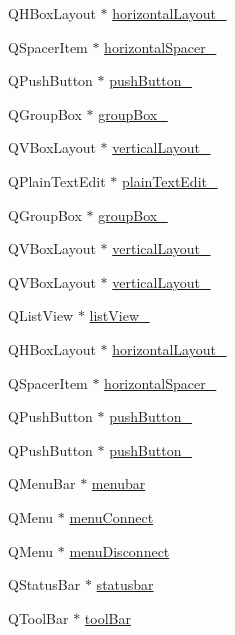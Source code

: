 \begin{DoxyCompactItemize}
\item 
Q\+H\+Box\+Layout $\ast$ \hyperlink{class_ui___client_view_a320d512fe1c190255fadb042dee71aa8}{horizontal\+Layout\+\_}
\item 
Q\+Spacer\+Item $\ast$ \hyperlink{class_ui___client_view_a1d8e4fc5f366b60e3dabdf6de7ff1a13}{horizontal\+Spacer\+\_}
\item 
Q\+Push\+Button $\ast$ \hyperlink{class_ui___client_view_abd60dd3bf35fb58cfc7a56dc620bb86d}{push\+Button\+\_}
\item 
Q\+Group\+Box $\ast$ \hyperlink{class_ui___client_view_a3c3b68713d02d91d0e03bbb7606d8d87}{group\+Box\+\_}
\item 
Q\+V\+Box\+Layout $\ast$ \hyperlink{class_ui___client_view_a706af0a833f04cec36051a3924174306}{vertical\+Layout\+\_}
\item 
Q\+Plain\+Text\+Edit $\ast$ \hyperlink{class_ui___client_view_a556640ed20d1f296411371f62ab33781}{plain\+Text\+Edit\+\_}
\item 
Q\+Group\+Box $\ast$ \hyperlink{class_ui___client_view_a3a9fd7a67b50cb8dcbf30f078068f510}{group\+Box\+\_}
\item 
Q\+V\+Box\+Layout $\ast$ \hyperlink{class_ui___client_view_a02f1b48679f4d1580d96394b42a95501}{vertical\+Layout\+\_}
\item 
Q\+V\+Box\+Layout $\ast$ \hyperlink{class_ui___client_view_a91d4597c0f391143550599e92f58da46}{vertical\+Layout\+\_}
\item 
Q\+List\+View $\ast$ \hyperlink{class_ui___client_view_ab0fd5aa8b588214df2353afe054f8728}{list\+View\+\_}
\item 
Q\+H\+Box\+Layout $\ast$ \hyperlink{class_ui___client_view_a81b9b206b81d2461f04caf90f510fd1b}{horizontal\+Layout\+\_}
\item 
Q\+Spacer\+Item $\ast$ \hyperlink{class_ui___client_view_ac93522e027c7e4f5839a65aa702309f7}{horizontal\+Spacer\+\_}
\item 
Q\+Push\+Button $\ast$ \hyperlink{class_ui___client_view_a7c3375ba5cb6bbc1655d590007c1e35a}{push\+Button\+\_}
\item 
Q\+Push\+Button $\ast$ \hyperlink{class_ui___client_view_a2371f6d8b07951b0ebc67e2ec57dac12}{push\+Button\+\_}
\item 
Q\+Menu\+Bar $\ast$ \hyperlink{class_ui___client_view_a1cad8813b8bdbf03b32a5fc9394fe445}{menubar}
\item 
Q\+Menu $\ast$ \hyperlink{class_ui___client_view_aa9e581ee0f7e8cc085d1c31050388e22}{menu\+Connect}
\item 
Q\+Menu $\ast$ \hyperlink{class_ui___client_view_afd776f219279b093a26a205207bb3530}{menu\+Disconnect}
\item 
Q\+Status\+Bar $\ast$ \hyperlink{class_ui___client_view_a5ccc50aea2bedaeb0abfaed52336fdd4}{statusbar}
\item 
Q\+Tool\+Bar $\ast$ \hyperlink{class_ui___client_view_af7e90f55cbfb0bd6caea82561e555d0a}{tool\+Bar}
\end{DoxyCompactItemize}


